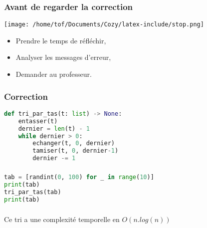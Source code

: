 \documentclass[svgnames,11pt]{beamer}
\begin{document}
\begin{frame}
    \frametitle{Avant de regarder la correction}
\begin{center}
    \centering
    \texttt{[image: /home/tof/Documents/Cozy/latex-include/stop.png]}
    \end{center}
{\Large
    \begin{itemize}
        \item Prendre le temps de réfléchir,
        \item Analyser les messages d'erreur,
        \item Demander au professeur.
    \end{itemize}
}
\end{frame}
\begin{frame}[fragile]
    \frametitle{Correction}

\begin{center}
\begin{lstlisting}[language=Python , basicstyle=\ttfamily\small, xleftmargin=2em, xrightmargin=2em]
def tri_par_tas(t: list) -> None:
    entasser(t)
    dernier = len(t) - 1
    while dernier > 0:
        echanger(t, 0, dernier)
        tamiser(t, 0, dernier-1)
        dernier -= 1
\end{lstlisting}
\end{center}   

\end{frame}
\begin{frame}[fragile]
    \frametitle{}

\begin{center}
\begin{lstlisting}[language=Python , basicstyle=\ttfamily\small, xleftmargin=2em, xrightmargin=2em]
tab = [randint(0, 100) for _ in range(10)]
print(tab)
tri_par_tas(tab)
print(tab)
\end{lstlisting}
\label{CODE}
\end{center}  

\end{frame}
\begin{frame}
    \frametitle{}

    \begin{center}
        Ce tri a une complexité temporelle en $O(n.log(n))$
    \end{center}

\end{frame}
\end{document}
